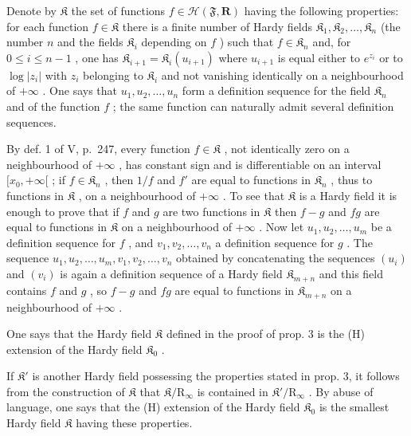 Denote by \(\mathfrak{K}\) the set of functions \(f\in \mathcal{H}(\mathfrak{F},\mathbf{R})\) having the following properties: for each function \(f\in \mathfrak{K}\) there is a finite number of Hardy fields \(\mathfrak{K}_1,\mathfrak{K}_2,\ldots ,\mathfrak{K}_n\) (the number \(n\) and the fields \(\mathfrak{K}_i\) depending on \(f\) ) such that \(f\in \mathfrak{K}_n\) and, for \(0\leqslant i\leqslant n - 1\) , one has \(\mathfrak{K}_{i + 1} = \mathfrak{K}_i(u_{i + 1})\) where \(u_{i + 1}\) is equal either to \(e^{z_i}\) or to \(\log |z_i|\) with \(z_{i}\) belonging to \(\mathfrak{K}_i\) and not vanishing identically on a neighbourhood of \(+\infty\) . One says that \(u_{1},u_{2},\ldots ,u_{n}\) form a definition sequence for the field \(\mathfrak{K}_n\) and of the function \(f\) ; the same function can naturally admit several definition sequences.

By def. 1 of V, p.~247, every function \(f \in \mathfrak{K}\) , not identically zero on a neighbourhood of \(+\infty\) , has constant sign and is differentiable on an interval \([x_0, +\infty[\) ; if \(f \in \mathfrak{K}_n\) , then \(1/f\) and \(f'\) are equal to functions in \(\mathfrak{K}_n\) , thus to functions in \(\mathfrak{K}\) , on a neighbourhood of \(+\infty\) . To see that \(\mathfrak{K}\) is a Hardy field it is enough to prove that if \(f\) and \(g\) are two functions in \(\mathfrak{K}\) then \(f - g\) and \(fg\) are equal to functions in \(\mathfrak{K}\) on a neighbourhood of \(+\infty\) . Now let \(u_1, u_2, \ldots, u_m\) be a definition sequence for \(f\) , and \(v_1, v_2, \ldots, v_n\) a definition sequence for \(g\) . The sequence \(u_1, u_2, \ldots, u_m, v_1, v_2, \ldots, v_n\) obtained by concatenating the sequences \((u_i)\) and \((v_i)\) is again a definition sequence of a Hardy field \(\mathfrak{K}_{m+n}\) and this field contains \(f\) and \(g\) , so \(f - g\) and \(fg\) are equal to functions in \(\mathfrak{K}_{m+n}\) on a neighbourhood of \(+\infty\) .

One says that the Hardy field \(\mathfrak{K}\) defined in the proof of prop. 3 is the (H) extension of the Hardy field \(\mathfrak{K}_0\) .

If \(\mathfrak{K}'\) is another Hardy field possessing the properties stated in prop. 3, it follows from the construction of \(\mathfrak{K}\) that \(\mathfrak{K} / \mathrm{R}_{\infty}\) is contained in \(\mathfrak{K}' / \mathrm{R}_{\infty}\) . By abuse of language, one says that the (H) extension of the Hardy field \(\mathfrak{K}_0\) is the smallest Hardy field \(\mathfrak{K}\) having these properties.

